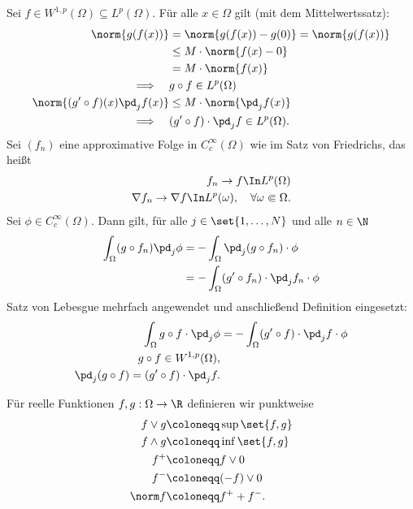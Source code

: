 \begin{beweis}
  Sei $f \in W^{1, p}(\Omega)\subseteq L^{p}(\Omega)$. Für alle $x \in \Omega$ gilt (mit dem Mittelwertssatz):
  \begin{align*}
    \norm{g(f(x))} &= \norm{g(f(x)) - g(0)} = \norm{g(f(x))}\\ 
    &\leq M\cdot\norm{f(x) - 0} \\
    &= M\cdot\norm{f(x)}\\
\implies \quad &g \circ f  \in L^{p}(\Omega)\\
\norm{(g'\circ f)(x) \pd_{j}f(x)}&\leq M\cdot \norm{\pd_{j}f(x)}\\
\implies \quad &(g' \circ f)\cdot \pd_{j}f  \in L^{p}(\Omega).
  \end{align*}
Sei $(f_{n})$ eine approximative Folge in $C_{c}^{\infty}(\Omega)$ wie im Satz von Friedrichs, das heißt
  \begin{align*}
     f_{n} \to f \In L^{p}(\Omega)\\
    \nabla f_{n}\to  \nabla f \In L^{p}(\omega), \quad \forall \omega \Subset \Omega.  
  \end{align*}
Sei $\phi \in C_{c}^{\infty}(\Omega)$. Dann gilt, für alle $j \in \set{1, \dots, N}$ und alle $n \in \N$
\begin{align*}
  \int_{\Omega} (g \circ f_{n})\pd_{j}\phi &= - \int_{\Omega} \pd_{j}(g \circ f_{n})\cdot\phi\\
 &= - \int_{\Omega} (g' \circ f_{n})\cdot\pd_{j} f_{n} \cdot\phi
\end{align*}
Satz von Lebesgue mehrfach angewendet und anschließend Definition eingesetzt: 
\begin{align*}
  \int_{\Omega} g \circ f \cdot \pd_{j}\phi &= - \int_{\Omega} (g' \circ f)\cdot\pd_{j} f \cdot\phi\\
g \circ f \in W^{1, p}(\Omega), \\
\pd_{j}(g \circ f) = (g' \circ f) \cdot \pd_{j} f. 
\end{align*}
\end{beweis}
Für reelle Funktionen $f, g : \Omega \to \R$ definieren wir punktweise
\begin{align*}
f \vee g &\coloneqq \sup \set{f, g}\\
f \wedge g &\coloneqq \inf \set{f, g}\\
f^{+}&\coloneqq f \vee 0\\
f^{-}&\coloneqq (-f) \vee 0\\
\norm f&\coloneqq f^{+} + f^{-}. 
\end{align*}
